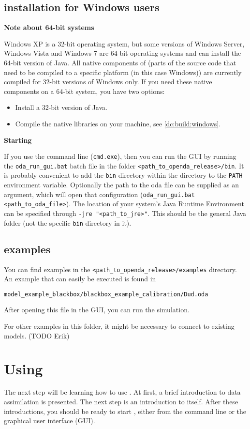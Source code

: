 \subsection{\oda installation for Windows users}
\textbf{Note about 64-bit systems}

Windows XP is a 32-bit operating system, but some versions of Windows Server, Windows Vista and Windows 7 are 64-bit operating systems and can install the 64-bit version of Java. All native components of \oda (parts of the source code that need to be compiled to a specific platform (in this case Windows)) are currently compiled for 32-bit versions of Windows only. If you need these native components on a 64-bit system, you have two options:
\begin{itemize}
\item Install a 32-bit version of Java.
\item Compile the native libraries on your machine, see \ref{dc:build:windows}.
\end{itemize}



\textbf{Starting \oda}

If you use the command line (\verb|cmd.exe|), then you can run the \oda GUI by running the \verb|oda_run_gui.bat| batch file in the folder \verb|<path_to_openda_release>/bin|. It is probably convenient to add the \verb|bin| directory within the \oda directory to the \verb|PATH| environment variable. Optionally the path to the oda file can be supplied as an argument, which will open that \oda configuration (\verb|oda_run_gui.bat <path_to_oda_file>|). The location of your system's Java Runtime Environment can be specified through \verb|-jre "<path_to_jre>"|. This should be the general Java folder (not the specific \verb|bin| directory in it).

\subsection{\oda examples}
You can find examples in the \verb|<path_to_openda_release>/examples| directory. An example that can easily be executed is found in

\verb|model_example_blackbox/blackbox_example_calibration/Dud.oda|

After opening this file in the GUI, you can run the simulation. 

For other examples in this folder, it might be necessary to connect to existing models. (TODO Erik)
\section{Using \oda}
The next step will be learning how to use \oda. At first, a brief introduction to data assimilation is presented. The next step is an introduction to \oda itself. After these introductions, you should be ready to start \oda, either from the command line or the graphical user interface (GUI). 

